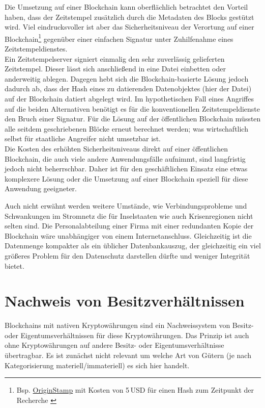 Die Umsetzung auf einer Blockchain kann oberflächlich betrachtet den Vorteil haben, dass der Zeitstempel zusätzlich durch die Metadaten des Blocks gestützt wird. Viel eindrucksvoller ist aber das Sicherheitsniveau der Verortung auf einer Blockchain\footnote{Bsp. \href{https://app.originstamp.org/}{OriginStamp} mit Kosten von 5\,USD für einen Hash zum Zeitpunkt der Recherche \autocite{w:originstamp}} gegenüber einer einfachen Signatur unter Zuhilfenahme eines Zeitstempeldienstes. \\
Ein Zeitstempelserver signiert einmalig den sehr zuverlässig gelieferten Zeitstempel. Dieser lässt sich anschließend in \zB{} eine Datei einbetten oder anderweitig ablegen. Dagegen hebt sich die Blockchain-basierte Lösung jedoch dadurch ab, dass der Hash eines zu datierenden Datenobjektes (hier der Datei) auf der Blockchain datiert abgelegt wird. Im hypothetischen Fall eines Angriffes auf die beiden Alternativen benötigt es für die konventionellen Zeitstempeldienste den Bruch einer Signatur. Für die Lösung auf der öffentlichen Blockchain müssten alle seitdem geschriebenen Blöcke erneut berechnet werden; was wirtschaftlich selbst für staatliche Angreifer nicht umsetzbar ist. \\
Die Kosten des erhöhten Sicherheitsniveaus direkt auf einer öffentlichen Blockchain, die auch viele andere Anwendungsfälle aufnimmt, sind langfristig jedoch nicht beherrschbar. Daher ist für den geschäftlichen Einsatz eine etwas komplexere Lösung oder die Umsetzung auf einer Blockchain speziell für diese Anwendung geeigneter.

Auch nicht erwähnt werden weitere Umstände, wie Verbindungsprobleme und Schwankungen im Stromnetz die für Inselstaaten wie auch Krisenregionen nicht selten sind. Die Personalabteilung einer Firma mit einer redundanten Kopie der Blockchain wäre unabhängiger von einem Internetanschluss. Gleichzeitig ist die Datenmenge kompakter als ein üblicher Datenbankauszug, der gleichzeitig ein viel größeres Problem für den Datenschutz darstellen dürfte und weniger Integrität bietet.

\section{Nachweis von Besitzverhältnissen}\label{uc:owning}

Blockchains mit nativen Kryptowährungen sind ein Nachweissystem von Besitz- oder Eigentumsverhältnissen für diese Kryptowährungen.
Das Prinzip ist auch ohne Kryptowährungen auf andere Besitz- oder Eigentumsverhältnisse übertragbar.
Es ist zunächst nicht relevant um welche Art von Gütern (je nach Kategorisierung \zB{} materiell/immateriell) es sich hier handelt.

